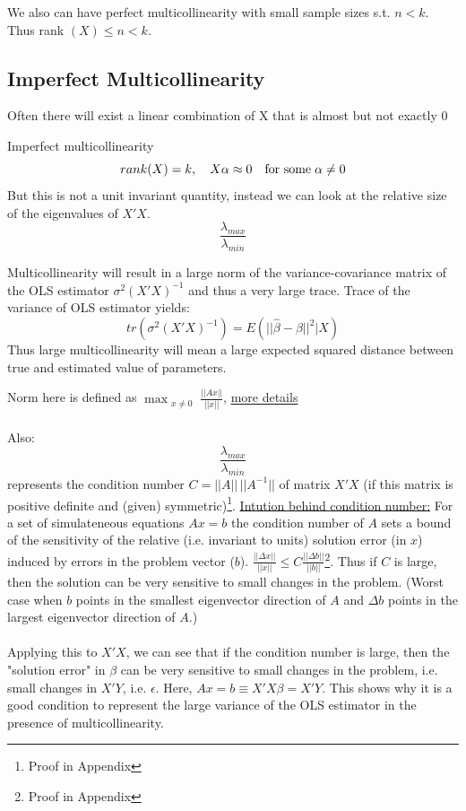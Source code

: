 \documentclass[DIV=14,titlepage=false]{scrreprt}
\begin{document}
We also can have perfect multicollinearity with small sample sizes s.t. \(n<k\). Thus rank \((X) \leq n < k\).

\subsection{Imperfect Multicollinearity}
Often there will exist a linear combination of X that is almost but not exactly 0

\begin{definition} Imperfect multicollinearity
\[rank(X)=k, \quad X\alpha \approx 0 \quad \text{for some} \hspace{1mm} \alpha \neq 0\]
But this is not a unit invariant quantity, instead we can look at the relative size of the eigenvalues of \(X'X\).
\[\frac{\lambda_{max}}{\lambda_{min}}\]

\end{definition}

\vspace{5mm}

\begin{corollary}
    Multicollinearity will result in a large norm of the variance-covariance matrix of the OLS estimator \(\sigma^2(X'X)^{-1}\) and thus a very large trace.
    Trace of the variance of OLS estimator yields:
    \[tr(\sigma^2(X'X)^{-1})=E(||\hat{\beta}-\beta||^2|X)\]
    Thus large multicollinearity will mean a large expected squared distance between true and estimated value of parameters.
\end{corollary}

\begin{note}
    Norm here is defined as \(\operatorname*{max}_{\substack{x\neq0}}\frac{||Ax||}{||x||}\), \href{https://math.mit.edu/~gs/linearalgebra/ila6/ila5conditionnumbers.pdf}{more details}
\\ \\
Also:
    \[\frac{\lambda_{max}}{\lambda_{min}}\] represents the condition number \(C = ||A|| \, ||A^{-1}||\) of matrix \(X'X\) (if this matrix is positive definite and (given) symmetric)\footnote{Proof in Appendix}. 
    \underline{Intution behind condition number:}
    For a set of simulateneous equations \(Ax=b\) the condition number of \(A\) sets a bound of the sensitivity of the relative (i.e. invariant to units) solution error (in \(x\)) induced by errors in the problem vector (\(b\)). \(\frac{||\Delta x||}{||x||} \leq C \frac{||\Delta b||}{||b||}\)\footnote{Proof in Appendix}. Thus if \(C\) is large, then the solution can be very sensitive to small changes in the problem. (Worst case when \(b\) points in the smallest eigenvector direction of \(A\) and \(\Delta b\) points in the largest eigenvector direction of \(A\).) \\
    \\
    Applying this to \(X'X\), we can see that if the condition number is large, then the "solution error" in \(\beta\) can be very sensitive to small changes in the problem, i.e. small changes in \(X'Y\), i.e. \(\epsilon\). 
    Here, \(Ax=b \equiv X'X\beta=X'Y\). This shows why it is a good condition to represent the large variance of the OLS estimator in the presence of multicollinearity.
\end{note}
\newpage
\end{document}
